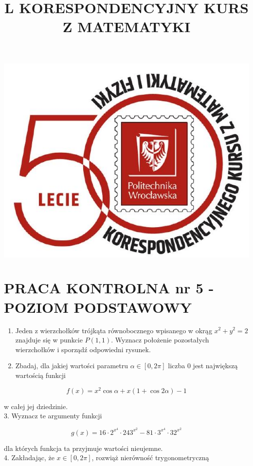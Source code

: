 \documentclass[10pt]{article}
\title{L KORESPONDENCYJNY KURS Z MATEMATYKI }
\author{}
\date{}
\begin{document}
\maketitle
\begin{center}
\includegraphics[max width=\textwidth]{2024_11_16_466ce4e71c453b990a66g-1}
\end{center}

\section*{PRACA KONTROLNA nr 5 - POZIOM PODSTAWOWY}
\begin{enumerate}
  \item Jeden z wierzchołków trójkąta równobocznego wpisanego w okrąg $x^{2}+y^{2}=2$ znajduje się w punkcie $P(1,1)$. Wyznacz położenie pozostałych wierzchołków i sporządź odpowiedni rysunek.
  \item Zbadaj, dla jakiej wartości parametru $\alpha \in[0,2 \pi]$ liczba 0 jest największą wartością funkcji
\end{enumerate}

$$
f(x)=x^{2} \cos \alpha+x(1+\cos 2 \alpha)-1
$$

w całej jej dziedzinie.\\
3. Wyznacz te argumenty funkcji

$$
g(x)=16 \cdot 2^{x^{4}} \cdot 243^{x^{2}}-81 \cdot 3^{x^{4}} \cdot 32^{x^{2}}
$$

dla których funkcja ta przyjmuje wartości nieujemne.\\
4. Zakładając, że $x \in[0,2 \pi]$, rozwiąż nierówność trygonometryczną
\end{document}
